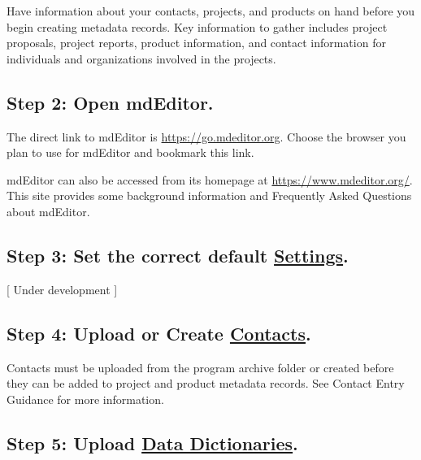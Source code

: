 \documentclass[
]{book}
\begin{document}
Have information about your contacts, projects, and products on hand before you begin creating metadata records. Key information to gather includes project proposals, project reports, product information, and contact information for individuals and organizations involved in the projects.

\hypertarget{step-2-open-mdeditor.}{%
\subsection{Step 2: Open mdEditor.}\label{step-2-open-mdeditor.}}

The direct link to mdEditor is \url{https://go.mdeditor.org}. Choose the browser you plan to use for mdEditor and bookmark this link.

mdEditor can also be accessed from its homepage at \url{https://www.mdeditor.org/}. This site provides some background information and Frequently Asked Questions about mdEditor.

\hypertarget{step-3-set-the-correct-default-settings.}{%
\subsection{\texorpdfstring{Step 3: Set the correct default \protect\hyperlink{settings}{Settings}.}{Step 3: Set the correct default Settings.}}\label{step-3-set-the-correct-default-settings.}}

{[} Under development {]}

\hypertarget{step-4-upload-or-create-contacts.}{%
\subsection{\texorpdfstring{Step 4: Upload or Create \protect\hyperlink{contact-entry-guidance}{Contacts}.}{Step 4: Upload or Create Contacts.}}\label{step-4-upload-or-create-contacts.}}

Contacts must be uploaded from the program archive folder or created before they can be added to project and product metadata records. See Contact Entry Guidance for more information.

\hypertarget{step-5-upload-data-dictionaries.}{%
\subsection{\texorpdfstring{Step 5: Upload \protect\hyperlink{dictionary-entry-guidance}{Data Dictionaries}.}{Step 5: Upload Data Dictionaries.}}\label{step-5-upload-data-dictionaries.}}
\end{document}
